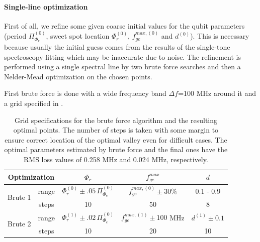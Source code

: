 \documentclass[%
 aip,
 amsmath,amssymb,
 reprint,%
]{revtex4-1}
\begin{document}
\paragraph{Single-line optimization}

First of all, we refine some given coarse initial values for the qubit parameters (period $\Pi_{\Phi_r}^{(0)}$, sweet spot location $\Phi_r^{(0)}$, $f_{ge}^{max, (0)}$ and $d^{(0)}$). This is necessary because usually the initial guess comes from the results of the single-tone spectroscopy fitting which may be inaccurate due to noise. The refinement is performed using a single spectral line by two brute force searches and then a Nelder-Mead optimization on the chosen points. 

First brute force is done with a wide frequency band $\Delta f$=100 MHz around it and a grid specified in .

\begin{table}
	\centering
	\begin{ruledtabular}
		\begin{tabular}{*5c} 
			\multicolumn{2}{c}{Optimization} & $\Phi_r$ & $f_{ge}^{max}$ &  	$d$\\
			\hline
			\multirow{2}{*}{Brute 1} & range & $\Phi_r^{(0)}\pm .05\, \Pi_{\Phi_e}^{(0)}$ & $f_{ge}^{max, (0)}\pm 30\%$ & 0.1 - 0.9  \\
			&steps & 10& 50& 8\\
			\multirow{2}{*}{Brute 2} & range & $\Phi_r^{(1)}\pm .02\, \Pi_{\Phi_e}^{(0)}$ & $f_{ge}^{max, (1)}\pm 100$ MHz & $d^{(1)}\pm 0.1$ \\
			& steps & 10 & 20 & 10
		\end{tabular}
	 
\end{ruledtabular}
	\caption{Grid specifications for the brute force algorithm and the resulting optimal points. The number of steps is taken with some margin to ensure correct location of the optimal valley even for difficult cases. The optimal parameters estimated by brute force and the final ones have the RMS loss values of 0.258 MHz and 0.024 MHz, respectively.}
	\label{tab:grid_tts}
\end{table}



\end{document}
